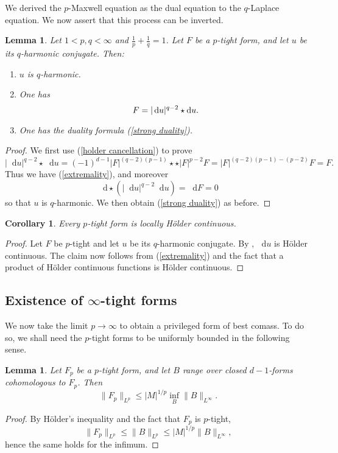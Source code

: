\documentclass[reqno,11pt]{amsart}
\newcommand*\dif{\mathop{}\!\mathrm{d}}
\newtheorem{lemma}[theorem]{Lemma}
\newtheorem{corollary}[theorem]{Corollary}
\theoremstyle{definition}
\numberwithin{equation}{section}
\begin{document}
We derived the $p$-Maxwell equation as the dual equation to the $q$-Laplace equation.
We now assert that this process can be inverted.

\begin{lemma}
Let $1 < p, q < \infty$ and $\frac{1}{p} + \frac{1}{q} = 1$.
Let $F$ be a $p$-tight form, and let $u$ be its $q$-harmonic conjugate. Then:
\begin{enumerate}
\item $u$ is $q$-harmonic.
\item One has 
\begin{equation}
F = |\dif u|^{q - 2} \star \dif u. \label{extremality} \\
\end{equation}
\item One has the duality formula (\ref{strong duality}).
\end{enumerate}
\end{lemma}
\begin{proof}
We first use (\ref{holder cancellation}) to prove
$$|\dif u|^{q - 2} \star \dif u = (-1)^{d - 1} |F|^{(q - 2)(p - 1)} \star \star |F|^{p - 2} F = |F|^{(q - 2)(p - 1) - (p - 2)} F = F.$$
Thus we have (\ref{extremality}), and moreover
$$\dif \star (|\dif u|^{q - 2} \dif u) = \dif F = 0$$
so that $u$ is $q$-harmonic.
We then obtain (\ref{strong duality}) as before.
\end{proof}

\begin{corollary}
Every $p$-tight form is locally H\"older continuous.
\end{corollary}
\begin{proof}
Let $F$ be $p$-tight and let $u$ be its $q$-harmonic conjugate.
By \cite[Theorem 2]{DIBENEDETTO1983827}, $\dif u$ is H\"older continuous.
The claim now follows from (\ref{extremality}) and the fact that a product of H\"older continuous functions is H\"older continuous.
\end{proof}


\subsection{\texorpdfstring{Existence of $\infty$-tight forms}{Existence of infinity-tight forms}}
We now take the limit $p \to \infty$ to obtain a privileged form of best comass.
To do so, we shall need the $p$-tight forms to be uniformly bounded in the following sense.

\begin{lemma}
Let $F_p$ be a $p$-tight form, and let $B$ range over closed $d - 1$-forms cohomologous to $F_p$. Then
\begin{equation}\label{infinity magnetic rules p magnetic}
	\|F_p\|_{L^p} \leq |M|^{1/p} \inf_B \|B\|_{L^\infty}.
\end{equation}
\end{lemma}
\begin{proof}
By H\"older's inequality and the fact that $F_p$ is $p$-tight,
$$\|F_p\|_{L^p} \leq \|B\|_{L^p} \leq |M|^{1/p} \|B\|_{L^\infty},$$
hence the same holds for the infimum.
\end{proof}
\end{document}
